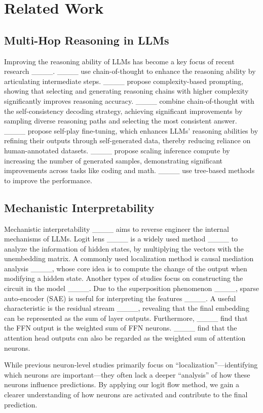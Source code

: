 \section{Related Work}
\subsection{Multi-Hop Reasoning in LLMs}
Improving the reasoning ability of LLMs has become a key focus of recent research ____. ____ use chain-of-thought to enhance the reasoning ability by articulating intermediate steps. ____ propose complexity-based prompting, showing that selecting and generating reasoning chains with higher complexity significantly improves reasoning accuracy. ____ combine chain-of-thought with the self-consistency decoding strategy, achieving significant improvements by sampling diverse reasoning paths and selecting the most consistent answer. ____ propose self-play fine-tuning, which enhances LLMs' reasoning abilities by refining their outputs through self-generated data, thereby reducing reliance on human-annotated datasets. ____ propose scaling inference compute by increasing the number of generated samples, demonstrating significant improvements across tasks like coding and math. ____ use tree-based methods to improve the performance.

\subsection{Mechanistic Interpretability}
Mechanistic interpretability ____ aims to reverse engineer the internal mechanisms of LLMs. Logit lens ____ is a widely used method ____ to analyze the information of hidden states, by multiplying the vectors with the unembedding matrix. A commonly used localization method is causal mediation analysis ____, whose core idea is to compute the change of the output when modifying a hidden state. Another types of studies focus on constructing the circuit in the model ____. Due to the superposition phenomenon ____, sparse auto-encoder (SAE) is useful for interpreting the features ____. A useful characteristic is the residual stream ____, revealing that the final embedding can be represented as the sum of layer outputs. Furthermore, ____ find that the FFN output is the weighted sum of FFN neurons. ____ find that the attention head outputs can also be regarded as the weighted sum of attention neurons. 

While previous neuron-level studies primarily focus on ``localization''—identifying which neurons are important—they often lack a deeper ``analysis'' of how these neurons influence predictions. By applying our logit flow method, we gain a clearer understanding of how neurons are activated and contribute to the final prediction.